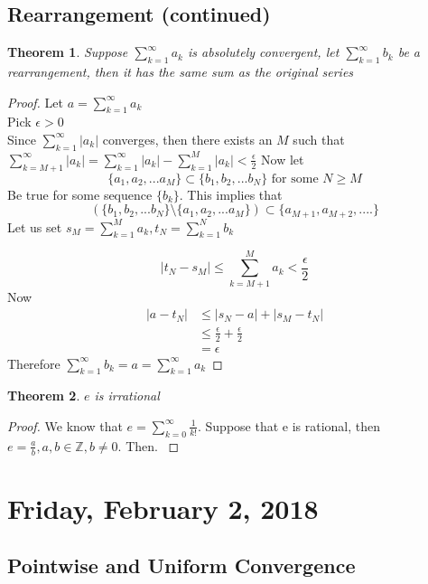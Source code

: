 \documentclass[12pt]{article}
\theoremstyle{plain}
\newtheorem{theorem}{Theorem}[section]
\theoremstyle{definition}
\begin{document}
\subsection{Rearrangement (continued)}

\begin{theorem}
	Suppose $\sum^\infty_{k=1} a_k$ is absolutely convergent, let $\sum^\infty_{k=1} b_k$ be a rearrangement, then it has the same sum as the original series
\end{theorem}

\begin{proof}
	Let $a = \sum^\infty_{k=1} a_k$\\
	Pick $\epsilon > 0$\\
	Since $\sum^\infty_{k=1} |a_k|$ converges, then there exists an $M$ such that $\sum^\infty_{k=M+1} |a_k| = \sum^\infty_{k=1} |a_k| - \sum^M_{k=1} |a_k| < \frac{\epsilon}{2}$
	Now let
	$$\{ a_1, a_2, ... a_M \} \subset \{ b_1, b_2, ... b_N \} \text{ for some } N \geq M $$
	Be true for some sequence $\{b_k \}$. This implies that
	$$(\{ b_1, b_2, ... b_N \} \setminus \{ a_1, a_2, ... a_M \})  \subset \{ a_{M+1}, a_{M+2}, .... \}$$
	Let us set $s_M = \sum^M_{k=1} a_k, t_N =  \sum^N_{k=1} b_k$
	
	$$|t_N - s_M| \leq  \sum^M_{k=M+1} a_k < \frac{\epsilon}{2}$$
	Now
	\begin{align*}
		|a - t_N| &\leq |s_N - a| + |s_M - t_N|\\
		&\leq  \frac{\epsilon}{2} +  \frac{\epsilon}{2}\\
		&= \epsilon
	\end{align*}
	Therefore $\sum^\infty_{k=1} b_k = a = \sum^\infty_{k=1} a_k$
\end{proof}

\begin{theorem}
	$e$ is irrational
\end{theorem}

\begin{proof}
	We know that $e = \sum^\infty_{k=0} \frac{1}{k!}$. Suppose that e is rational, then $e = \frac{a}{b}, a,b\in\mathbb{Z}, b \neq 0$. Then.
	$$
\end{proof}



\newpage

\section{Friday, February 2, 2018}

\subsection{Pointwise and Uniform Convergence}
\end{document}
